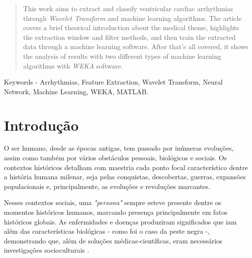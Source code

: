 \documentclass[conference]{IEEEtran}
\begin{document}




\maketitle

\begin{abstract}
This work aims to extract and classify ventricular cardiac arrhythmias through \textit{Wavelet Transform} and machine learning algorithms. The article covers a brief theorical introduction about the medical theme, highlights the extraction window and filter methods, and then train the extracted data through a machine learning software. After that's all covered, it shows the analysis of results with two different types of machine learning algorithms with \textit{WEKA} software.
\end{abstract}

Keywords - Arrhythmias, Feature Extraction, Wavelet Transform, Neural Network, Machine Learning, WEKA, MATLAB.


%
\IEEEpeerreviewmaketitle



\section{Introdução}

O ser humano, desde as épocas antigas, tem passado por inúmeras evoluções, assim como também por vários obstáculos pessoais, biológicos e sociais. Os contextos históricos detalham com maestria cada ponto focal característico dentre a história humana milenar, seja pelas conquistas, descobertas, guerras, expansões populacionais e, principalmente, as evoluções e revoluções marcantes.

Nesses contextos sociais, uma \textit{"persona"} sempre esteve presente dentre os momentos históricos humanos, marcando presença principalmente em fatos históricos globais. As enfermidades e doenças produziram significados que iam além das características biológicas - como foi o caso da peste negra -, demonstrando que, além de soluções médicas-científicas, eram necessários investigações socioculturais \cite{barata06}.
\end{document}
